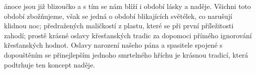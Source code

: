 \documentclass{article}
\begin{document}

ánoce jsou již blizoučko a s tím se nám blíží i období lásky a naděje.
Všichni toto období zbožňujeme, však se jedná o období blikajících světélek, co narušují klidnou noc;
předražených maličkostí z plastu, které se při první příležitosti zahodí;
prostě krásné oslavy křesťanských tradic za dopomoci přímého ignorování křesťanských hodnot.
Oslavy narození našeho pána a spasitele spojené s dopouštěním se přinejlepším jednoho smrtelného hříchu je krásnou tradicí, která podtrhuje ten koncept naděje.
\end{document}

